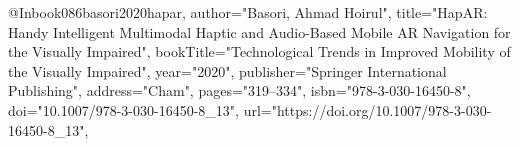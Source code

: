 @Inbook{086basori2020hapar,
author="Basori, Ahmad Hoirul",
title="HapAR: Handy Intelligent Multimodal Haptic and Audio-Based Mobile AR Navigation for the Visually Impaired",
bookTitle="Technological Trends in Improved Mobility of the Visually Impaired",
year="2020",
publisher="Springer International Publishing",
address="Cham",
pages="319--334",
isbn="978-3-030-16450-8",
doi="10.1007/978-3-030-16450-8_13",
url="https://doi.org/10.1007/978-3-030-16450-8_13",
}